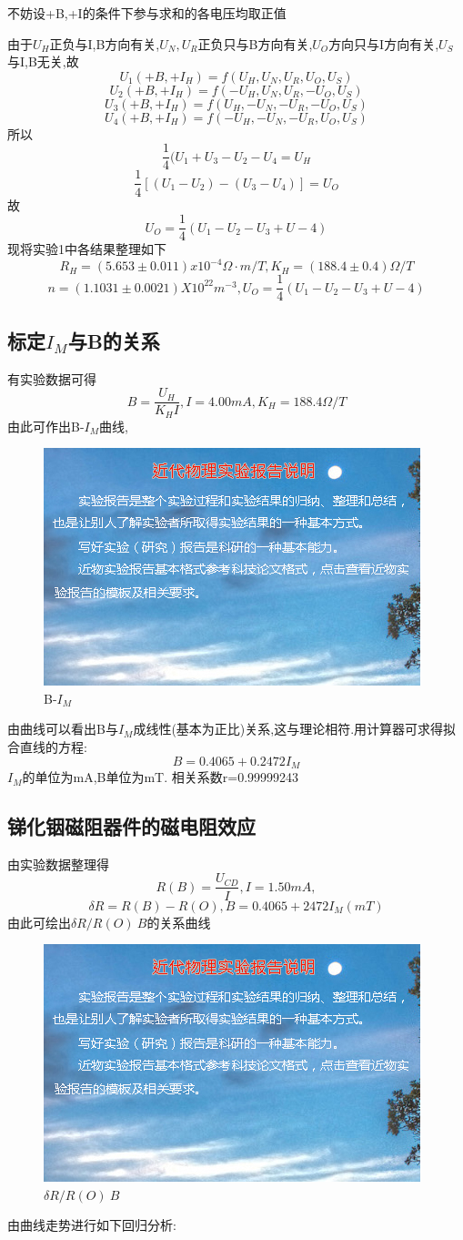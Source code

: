\documentclass{thuemp}
\begin{document}
不妨设+B,+I的条件下参与求和的各电压均取正值

由于$U_{H}$正负与I,B方向有关,$U_{N},U_{R}$正负只与B方向有关,$U_{O}$方向只与I方向有关,$U_{S}$与I,B无关,故
\[U_{1}(+B,+I_{H})=f(U_{H},U_{N},U_{R},U_{O},U_{S})\]
\[U_{2}(+B,+I_{H})=f(-U_{H},U_{N},U_{R},-U_{O},U_{S})\]
\[U_{3}(+B,+I_{H})=f(U_{H},-U_{N},-U_{R},-U_{O},U_{S})\]
\[U_{4}(+B,+I_{H})=f(-U_{H},-U_{N},-U_{R},U_{O},U_{S})\]
所以
\[\frac{1}{4}(U_{1}+U_{3}-U_{2}-U_{4}=U_{H}\]
\[\frac{1}{4}[(U_{1}-U_{2})-(U_{3}-U_{4})]=U_{O}\]
故\[U_{O}=\frac{1}{4}(U_{1}-U_{2}-U_{3}+U-{4})\]
现将实验1中各结果整理如下
\[R_{H}=(5.653\pm0.011)x10^{-4} \Omega ·m/T,K_{H}=(188.4\pm 0.4 )\Omega /T\]
\[n=(1.1031\pm0.0021)X10^{22}m^{-3},U_{O}=\frac{1}{4}(U_{1}-U_{2}-U_{3}+U-{4})\]
\subsection{标定$I_{M}$与B的关系}
有实验数据可得
\[B=\frac{U_{H}}{K_{H}I},I=4.00mA,K_{H}=188.4 \Omega/T\]
由此可作出B-$I_{M}$曲线,
\begin{figure}[H]
	\centering
	\includegraphics[width=0.8\linewidth]{./image/example.jpg}
	\caption{B-$I_{M}$} \label{fig:eg}
\end{figure}
由曲线可以看出B与$I_{M}$成线性(基本为正比)关系,这与理论相符.用计算器可求得拟合直线的方程:
\[B=0.4065+0.2472I_{M}\]
$I_{M}$的单位为mA,B单位为mT.
相关系数r=0.99999243
\subsection{锑化铟磁阻器件的磁电阻效应}
由实验数据整理得
\[R(B)=\frac{U_{CD}}{I} ,I=1.50mA,\]
\[\delta R=R(B)-R(O),B=0.4065+2472I_{M}(mT)\]
由此可绘出$\delta R/R(O)~B$的关系曲线
\begin{figure}[H]
	\centering
	\includegraphics[width=0.8\linewidth]{./image/example.jpg}
	\caption{$\delta R/R(O)~B$} \label{fig:eg}
\end{figure}
由曲线走势进行如下回归分析:
\end{document}
